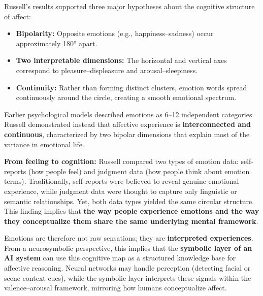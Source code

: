 \documentclass[12pt]{article}
\begin{document}
\noindent
Russell’s results supported three major hypotheses about the cognitive structure of affect:
\begin{itemize}
    \item \textbf{Bipolarity:} Opposite emotions (e.g., happiness–sadness) occur approximately 180° apart.
    \item \textbf{Two interpretable dimensions:} The horizontal and vertical axes correspond to pleasure–displeasure and arousal–sleepiness.
    \item \textbf{Continuity:} Rather than forming distinct clusters, emotion words spread continuously around the circle, creating a smooth emotional spectrum.
\end{itemize}

Earlier psychological models described emotions as 6–12 independent categories. Russell demonstrated instead that affective experience is \textbf{interconnected and continuous}, characterized by two bipolar dimensions that explain most of the variance in emotional life.

\bigskip
\noindent
\textbf{From feeling to cognition:}  
Russell compared two types of emotion data: self-reports (how people feel) and judgment data (how people think about emotion terms). Traditionally, self-reports were believed to reveal genuine emotional experience, while judgment data were thought to capture only linguistic or semantic relationships. Yet, both data types yielded the same circular structure. This finding implies that \textbf{the way people experience emotions and the way they conceptualize them share the same underlying mental framework}.

\medskip
\noindent
Emotions are therefore not raw sensations; they are \textbf{interpreted experiences}.
From a neurosymbolic perspective, this implies that the \textbf{symbolic layer of an AI system} can use this cognitive map as a structured knowledge base for affective reasoning. Neural networks may handle perception (detecting facial or scene context cues), while the symbolic layer interprets these signals within the valence–arousal framework, mirroring how humans conceptualize affect.
\end{document}
